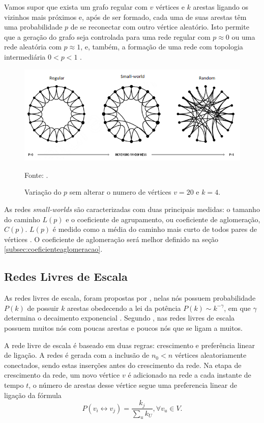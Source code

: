  Vamos supor que exista um grafo regular com $v$ vértices e $k$ arestas ligando os vizinhos mais próximos e, após de ser formado, cada uma de suas arestas têm uma probabilidade $p$ de se reconectar com outro vértice aleatório. Isto permite que a geração do grafo seja controlada para uma rede regular com $p \approx 0$ ou uma rede aleatória com $p \approx 1$, e, também, a formação de uma rede com topologia intermediária $0 < p < 1$ \cite{lopes2011redes}.
 \begin{figure}[!htb]
 	\caption{Variação do $p$ sem alterar o numero de vértices $v = 20$ e $k = 4$.}
 	\begin{center}
 		\includegraphics[width=0.9\linewidth]{imagens/watts-sm}
 	\end{center}
 	\small{Fonte: \citet{watts1998collective}.}
 	\label{fig:watts-sm}
 \end{figure} 
 
 As redes \textit{small-worlds} são caracterizadas com duas principais medidas: o tamanho do caminho $L(p)$ e o coeficiente de agrupamento, ou coeficiente de aglomeração, $C(p)$. $L(p)$ é medido como a média do caminho mais curto de todos pares de vértices \cite{lopes2011redes}. O coeficiente de aglomeração será melhor definido na seção \ref{subsec:coeficienteaglomeracao}.
 
 \subsection{Redes Livres de Escala}
 As redes livres de escala, foram propostas por \citet{barabasi1999emergence}, nelas nós possuem probabilidade \(P(k)\) de possuir \(k\) arestas obedecendo a lei da potência \(P(k) \sim k^{-\gamma}\), em que $\gamma$ determina o decaimento exponencial \cite{Antiqueira2005, lopes2011redes}. Segundo \citet{Viana2007}, nas redes livres de escala possuem muitos nós com poucas arestas e poucos nós que se ligam a muitos.
 
A rede livre de escala é baseado em duas regras: crescimento e preferência linear de ligação. A redes é gerada com a inclusão de $n_0 < n$ vértices aleatoriamente conectados, sendo estas inserções antes do crescimento da rede. 
Na etapa de crescimento da rede, um novo vértice $v$ é adicionado na rede a cada instante de tempo $t$, o número de arestas desse vértice segue uma preferencia linear de ligação da fórmula
\[ P(v_i \leftrightarrow v_j) = \frac{k_j}{\sum_u k_U}, \forall v_u \in V .\]

